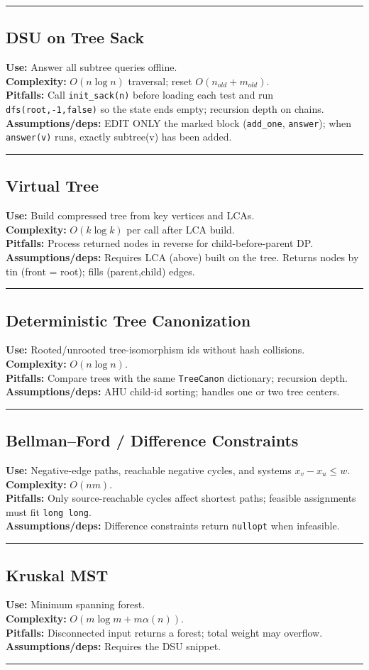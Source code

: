 \documentclass[a4paper,landscape]{article}
\newcommand{\alg}[6]{
\par\noindent\rule{\linewidth}{0.4pt}\par
\subsection{#1}
\textbf{Use:} #2\\
\textbf{Complexity:} #3\\
\textbf{Pitfalls:} #4\\
\textbf{Assumptions/deps:} #5

}
\begin{document}
\begin{multicols}{2}
\alg{DSU on Tree Sack}{Answer all subtree queries offline.}{$O(n\log n)$ traversal; reset $O(n_{old}+m_{old})$.}{Call \texttt{init\_sack(n)} before loading each test and run \texttt{dfs(root,-1,false)} so the state ends empty; recursion depth on chains.}{EDIT ONLY the marked block (\texttt{add\_one}, \texttt{answer}); when \texttt{answer(v)} runs, exactly subtree(v) has been added.}{sections/graph/dsu_on_tree_sack.cpp}
\alg{Virtual Tree}{Build compressed tree from key vertices and LCAs.}{$O(k\log k)$ per call after LCA build.}{Process returned nodes in reverse for child-before-parent DP.}{Requires LCA (above) built on the tree. Returns nodes by tin (front = root); fills (parent,child) edges.}{sections/graph/virtual_tree.cpp}
\alg{Deterministic Tree Canonization}{Rooted/unrooted tree-isomorphism ids without hash collisions.}{$O(n\log n)$.}{Compare trees with the same \texttt{TreeCanon} dictionary; recursion depth.}{AHU child-id sorting; handles one or two tree centers.}{sections/graph/tree_hashing.cpp}
\alg{Bellman--Ford / Difference Constraints}{Negative-edge paths, reachable negative cycles, and systems $x_v-x_u\le w$.}{$O(nm)$.}{Only source-reachable cycles affect shortest paths; feasible assignments must fit \texttt{long long}.}{Difference constraints return \texttt{nullopt} when infeasible.}{sections/graph/bellman_ford.cpp}
\alg{Kruskal MST}{Minimum spanning forest.}{$O(m\log m+m\alpha(n))$.}{Disconnected input returns a forest; total weight may overflow.}{Requires the DSU snippet.}{sections/graph/kruskal_mst.cpp}
\par\noindent\rule{\linewidth}{0.4pt}\par

\end{multicols}
\end{document}
